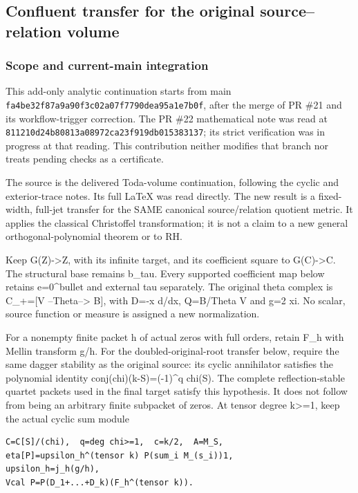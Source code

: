 \subsection{Confluent transfer for the original source--relation volume}\label{endpoint-pr24_current_corrected--confluent-transfer-for-the-original-sourcerelation-volume}

\subsubsection{Scope and current-main integration}\label{endpoint-pr24_current_corrected--scope-and-current-main-integration}

This add-only analytic continuation starts from main \nolinkurl{fa4be32f87a9a90f3c02a07f7790dea95a1e7b0f}, after the merge of PR \#21 and its workflow-trigger correction. The PR \#22 mathematical note was read at \nolinkurl{811210d24b80813a08972ca23f919db015383137}; its strict verification was in progress at that reading. This contribution neither modifies that branch nor treats pending checks as a certificate.

The source is the delivered Toda-volume continuation, following the cyclic and exterior-trace notes. Its full LaTeX was read directly. The new result is a fixed-width, full-jet transfer for the SAME canonical source/relation quotient metric. It applies the classical Christoffel transformation; it is not a claim to a new general orthogonal-polynomial theorem or to RH.

Keep G(Z)-\textgreater Z, with its infinite target, and its coefficient square to G(C)-\textgreater C. The structural base remains b\_tau. Every supported coefficient map below retains e=0\^{}bullet and external tau separately. The original theta complex is C\_+={[}V --Theta--\textgreater{} B{]}, with D=-x d/dx, Q=B/Theta V and g=2 xi. No scalar, source function or measure is assigned a new normalization.

For a nonempty finite packet h of actual zeros with full orders, retain F\_h with Mellin transform g/h. For the doubled-original-root transfer below, require the same dagger stability as the original source: its cyclic annihilator satisfies the polynomial identity conj(chi)(k-S)=(-1)\^{}q chi(S). The complete reflection-stable quartet packets used in the final target satisfy this hypothesis. It does not follow from being an arbitrary finite subpacket of zeros. At tensor degree k\textgreater=1, keep the actual cyclic sum module

\begin{verbatim}
C=C[S]/(chi),  q=deg chi>=1,  c=k/2,  A=M_S,
eta[P]=upsilon_h^(tensor k) P(sum_i M_(s_i))1,
upsilon_h=j_h(g/h),
Vcal P=P(D_1+...+D_k)(F_h^(tensor k)).
\end{verbatim}

